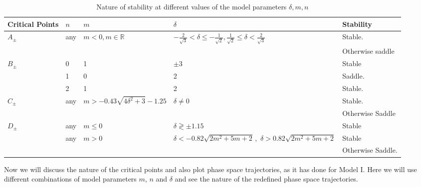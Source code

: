 \documentclass[a4paper,12pt]{article}
\begin{document}
\begin{table}[h!]
\centering 
\begin{tabular}{|p{1.5cm}|p{1cm}|p{3cm}|p{6cm}|p{2cm}|}
\hline
Critical Points & $n$ & $m$ & $\delta$ & Stability\\
\hline
\hline
$ A_{\pm} $ & any & $ m<0, m \in \mathbb{R} $ &  $ -\frac{2}{\sqrt{3}}<\delta \leq -\frac{1}{\sqrt{2}}, \frac{1}{\sqrt{2}}\leq \delta <\frac{2}{\sqrt{3}}  $ & Stable.   \\
\cline{2- 5}
&&&& Otherwise saddle \\
\hline
$ B_{\pm} $	 & 0 & 1 & $ \pm 3 $ & Stable \\
& 1 & 0 & 2 & Saddle. \\
& 2 & 1& 2 & Stable. \\
\hline
$ C_{\pm} $ & any & $m>-0.43 \sqrt{4 \delta ^2+3}-1.25$ & $ \delta \ne 0 $ &  Stable. \\
\cline{2- 5}
&&& & Otherwise Saddle \\
\hline
$ D_{\pm} $ & any & $ m \le 0  $ & $ \delta \gtrless \pm 1.15$ & Stable \\
\cline{2- 5}
& any & $ m > 0 $ & $ \delta <-0.82 \sqrt{2 m^2+5 m+2} \, , $ \newline $ \delta >0.82 \sqrt{2 m^2+5 m+2} $ & Stable \\
\cline{2- 5}
&&&& Otherwise Saddle. \\
\hline
\end{tabular}
\caption{Nature of stability at different values of the model parameters $\delta,m,n$}
\label{Tab:M2d}
\end{table}
Now we will discuss the nature of the critical points and also plot phase space trajectories, as it has done for Model I. Here we will use different combinations of model parameters $m$, $n$ and $\delta$  and see the nature of the redefined phase space trajectories.
\end{document}
